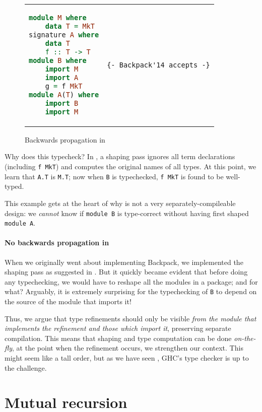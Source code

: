 \begin{figure}[H]
\begin{tabular}{p{} p{}}
\begin{lstlisting}[language=Haskell,escapechar=@]
module M where
    data T = MkT
signature A where
    data T
    f :: T -> T
module B where
    import M
    import A
    g = f MkT
module A(T) where
    import B
    import M
\end{lstlisting}
&
\begin{verbatim}
{- Backpack'14 accepts -}
\end{verbatim}
\end{tabular}
\caption{Backwards propagation in \OldBackpack{}}
\label{fig:double-vision-backwards-propagating-old-backpack}
\end{figure}

\noindent
Why does this typecheck?  In \OldBackpack{}, a shaping pass ignores
all term declarations (including \verb|f MkT|) and computes the
original names of all types.  At this point, we learn that \verb|A.T|
is \verb|M.T|; now when \verb|B| is typechecked, \verb|f MkT| is found
to be well-typed.

This example gets at the heart of why \OldBackpack{} is not a very
separately-compileable design: we \emph{cannot} know if \verb|module B| is
type-correct without having first shaped \verb|module A|.

\paragraph{No backwards propagation in \Backpack{}}  When we originally
went about implementing Backpack, we implemented the shaping pass
as suggested in \OldBackpack{}.  But it quickly became evident that before
doing any typechecking, we would have to reshape all the modules in a package;
and for what?  Arguably, it is extremely surprising for the typechecking of
\verb|B| to depend on the source of the module that imports it!

Thus, we argue that type refinements should only be visible \emph{from the
module that implements the refinement and those which import it},
preserving separate compilation.  This means that shaping and type
computation can be done \emph{on-the-fly}, at the point when the refinement
occurs, we strengthen our context.  This might seem like a tall order,
but as we have seen , GHC's type checker is up to the challenge.

\section{Mutual recursion}

